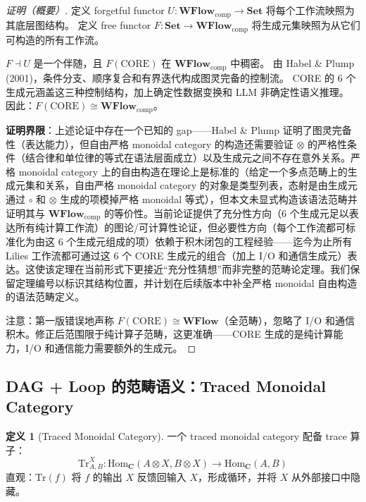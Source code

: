 \documentclass[11pt,a4paper]{article}
\theoremstyle{definition}
\theoremstyle{definition}
\newtheorem{definition}[theorem]{定义}
\theoremstyle{remark}
\newcommand{\cat}[1]{\mathbf{#1}}
\newcommand{\catWFlow}{\cat{WFlow}}
\newcommand{\catSet}{\cat{Set}}
\newcommand{\homset}[3]{\mathrm{Hom}_{#1}(#2, #3)}
\newcommand{\functor}[3]{#1: #2 \to #3}
\newcommand{\adjunction}{\dashv}
\newcommand{\tensor}{\otimes}
\begin{document}
\begin{proof}[证明（概要）]
定义 forgetful functor $\functor{U}{\catWFlow_{\mathrm{comp}}}{\catSet}$ 将每个工作流映照为其底层图结构。
定义 free functor $\functor{F}{\catSet}{\catWFlow_{\mathrm{comp}}}$ 将生成元集映照为从它们可构造的所有工作流。

$F \adjunction U$ 是一个伴随，且 $F(\mathrm{CORE})$ 在 $\catWFlow_{\mathrm{comp}}$ 中稠密。
由 Habel \& Plump (2001)，条件分支、顺序复合和有界迭代构成图灵完备的控制流。
CORE 的 6 个生成元涵盖这三种控制结构，加上确定性数据变换和 LLM 非确定性语义推理。
因此：$F(\mathrm{CORE}) \cong \catWFlow_{\mathrm{comp}}$。

\textbf{证明界限}：上述论证中存在一个已知的 gap——Habel \& Plump 证明了图灵完备性（表达能力），但自由严格 monoidal category 的构造还需要验证 $\tensor$ 的严格性条件（结合律和单位律的等式在语法层面成立）以及生成元之间不存在意外关系。严格 monoidal category 上的自由构造在理论上是标准的（给定一个多点范畴上的生成元集和关系，自由严格 monoidal category 的对象是类型列表，态射是由生成元通过 $\circ$ 和 $\tensor$ 生成的项模掉严格 monoidal 等式），但本文未显式构造该语法范畴并证明其与 $\catWFlow_{\mathrm{comp}}$ 的等价性。当前论证提供了充分性方向（6 个生成元足以表达所有纯计算工作流）的图论/可计算性论证，但必要性方向（每个工作流都可标准化为由这 6 个生成元组成的项）依赖于积木闭包的工程经验——迄今为止所有 Lilies 工作流都可通过这 6 个 CORE 生成元的组合（加上 I/O 和通信生成元）表达。这使该定理在当前形式下更接近``充分性猜想''而非完整的范畴论定理。我们保留定理编号以标识其结构位置，并计划在后续版本中补全严格 monoidal 自由构造的语法范畴定义。

注意：第一版错误地声称 $F(\mathrm{CORE}) \cong \catWFlow$（全范畴），忽略了 I/O 和通信积木。修正后范围限于纯计算子范畴，这更准确——CORE 生成的是纯计算能力，I/O 和通信能力需要额外的生成元。
\end{proof}

\subsection{DAG + Loop 的范畴语义：Traced Monoidal Category}

\begin{definition}[Traced Monoidal Category]
一个 traced monoidal category 配备 trace 算子：
\[
\mathrm{Tr}^{X}_{A,B}: \homset{\cat{C}}{A\tensor X}{B\tensor X} \to \homset{\cat{C}}{A}{B}
\]
直观：$\mathrm{Tr}(f)$ 将 $f$ 的输出 $X$ 反馈回输入 $X$，形成循环，并将 $X$ 从外部接口中隐藏。
\end{definition}
\end{document}
